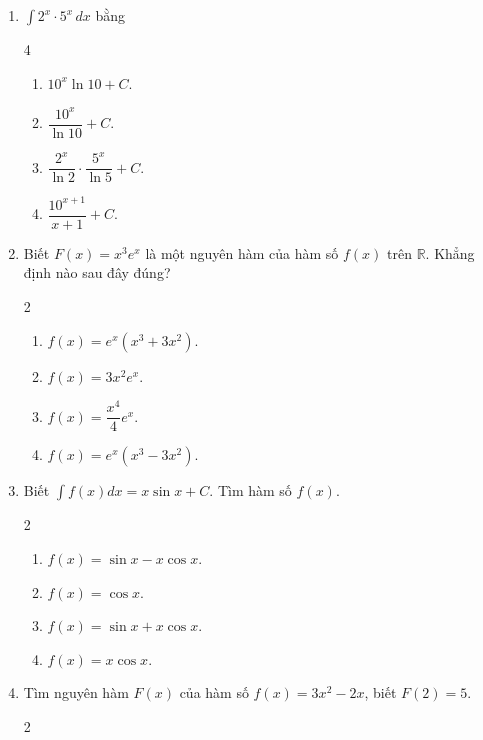 \documentclass[12pt]{article}
\begin{document}
\begin{enumerate}[label=\textbf{Câu \arabic*.}]
		\item $\displaystyle \int 2^x \cdot 5^x \,dx$ bằng
		\begin{multicols}{4}
			\begin{enumerate}[label=\textbf{\Alph*.}]
				
				\item $10^x \ln 10 + C$.
				\item $\dfrac{10^x}{\ln 10} + C$.
				\item $\dfrac{2^x}{\ln 2} \cdot \dfrac{5^x}{\ln 5} + C$.
				\item $\dfrac{10^{x+1}}{x+1} + C$.
			\end{enumerate}
		\end{multicols}
		
		\item Biết $F(x) = x^3 e^x$ là một nguyên hàm của hàm số $f(x)$ trên $\mathbb{R}$. Khẳng định nào sau đây đúng?
		\begin{multicols}{2}
			\begin{enumerate}[label=\textbf{\Alph*.}]
				\item $f(x) = e^x(x^3 + 3x^2)$.
				\item $f(x) = 3x^2 e^x$.
				\item $f(x) = \dfrac{x^4}{4} e^x$.
				\item $f(x) = e^x(x^3 - 3x^2)$.
			\end{enumerate}
		\end{multicols}
		
		\item Biết $\displaystyle \int f(x)dx = x\sin x + C$. Tìm hàm số $f(x)$.
		\begin{multicols}{2}
			\begin{enumerate}[label=\textbf{\Alph*.}]
				
				\item $f(x) = \sin x - x\cos x$.
				\item $f(x) = \cos x$.
				\item $f(x) = \sin x + x\cos x$.
				\item $f(x) = x\cos x$.
			\end{enumerate}
		\end{multicols}
		
		\item Tìm nguyên hàm $F(x)$ của hàm số $f(x) = 3x^2 - 2x$, biết $F(2) = 5$.
		\begin{multicols}{2}
			\begin{enumerate}[label=\textbf{\Alph*.}]
				

\end{enumerate}
\end{multicols}
\end{enumerate}
\end{document}
